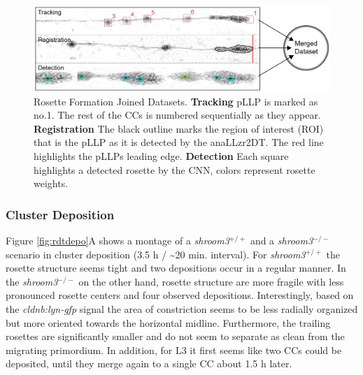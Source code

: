 \documentclass[10pt, b5paper, singlespacinge, twoside]{reedthesis} %
\theoremstyle{definition}
\theoremstyle{definition}
\theoremstyle{definition}
\theoremstyle{remark}
\begin{document}
\begin{figure}[H]

{\centering \includegraphics[width=0.85\linewidth]{figures/results/03_rosettes/RDT-01} 

}

\caption[Rosette Formation Joined Datasets]{Rosette Formation Joined Datasets. \textbf{Tracking} pLLP is marked as no.1. The rest of the CCs is numbered sequentially as they appear. \textbf{Registration} The black outline marks the region of interest (ROI) that is the pLLP as it is detected by the anaLLzr2DT. The red line highlights the pLLPs leading edge. \textbf{Detection} Each square highlights a detected rosette by the CNN, colors represent rosette weights.}\label{fig:rdt}
\end{figure}
\hypertarget{cluster-deposition}{%
\subsubsection{Cluster Deposition}\label{cluster-deposition}}

Figure \ref{fig:rdtdepo}A shows a montage of a \emph{shroom3}\(^{+/+}\) and a \emph{shroom3}\(^{-/-}\) scenario in cluster deposition (3.5 h / \textasciitilde20 min. interval). For \emph{shroom3}\(^{+/+}\) the rosette structure seems tight and two depositions occur in a regular manner. In the \emph{shroom3}\(^{-/-}\) on the other hand, rosette structure are more fragile with less pronounced rosette centers and four observed depositions. Interestingly, based on the \emph{cldnb:lyn-gfp} signal the area of constriction seems to be less radially organized but more oriented towards the horizontal midline. Furthermore, the trailing rosettes are significantly smaller and do not seem to separate as clean from the migrating primordium. In addition, for L3 it first seems like two CCs could be deposited, until they merge again to a single CC about 1.5 h later.
\end{document}
